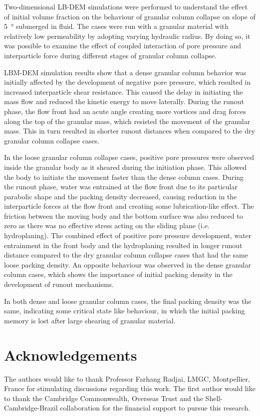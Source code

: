 \documentclass[12pt,twoside]{tuhhproc-en}
\begin{document}
Two-dimensional LB-DEM simulations were performed to understand the effect of initial volume fraction on the behaviour of granular column collapse on slope of \SI{5}{\degree} submerged in fluid. The cases were run with a granular material with relatively low permeability by adopting varying hydraulic radius. By doing so, it was possible to examine the effect of coupled interaction of pore pressure and interparticle force during different stages of granular column collapse.

LBM-DEM simulation results show that a dense granular column behavior was initially affected by the development of negative pore pressure, which resulted in increased interparticle shear resistance. This caused the delay in initiating the mass flow and reduced the kinetic energy to move laterally. During the runout phase, the flow front had an acute angle creating more vortices and drag forces along the top of the granular mass, which resisted the movement of the granular mass. This in turn resulted in shorter runout distances when compared to the dry granular column collapse cases.  

In the loose granular column collapse cases, positive pore pressures were observed inside the granular body as it sheared during the initiation phase. This allowed the body to initiate the movement faster than the dense column cases. During the runout phase, water was entrained at the flow front due to its particular parabolic shape and the packing density decreased, causing reduction in the interparticle forces at the flow front and creating some lubrication-like effect. The friction between the moving body and the bottom surface was also reduced to zero as there was no effective stress acting on the sliding plane (i.e. hydroplaning). The combined effect of positive pore pressure development, water entrainment in the front body and the hydroplaning resulted in longer runout distance compared to the dry granular column collapse cases that had the same loose packing density. An opposite behaviour was observed in the dense granular column cases, which shows the importance of initial packing density in the development of runout mechanisms.

In both dense and loose granular column cases, the final packing density was the same, indicating some critical state like behaviour, in which the initial packing memory is lost after large shearing of granular material.

\section{Acknowledgements}
The authors would like to thank Professor Farhang Radjai, LMGC, Montpellier, France for stimulating discussions regarding this work. The first author would like to thank the Cambridge Commonwealth, Overseas Trust and the Shell-Cambridge-Brazil collaboration for the financial support to pursue this research.
\end{document}
